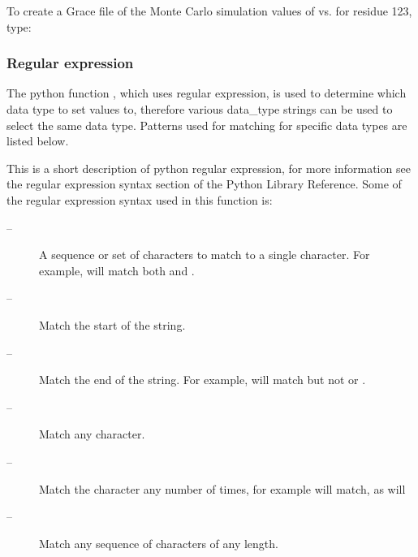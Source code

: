 
 To create a Grace file of the Monte Carlo simulation values of  vs.  for residue 123, type: 
  



  
 \subsubsection{Regular expression} 

 The python function , which uses regular expression, is used to determine which data type to set values to, therefore various data\_type strings can be used to select the same data type.  Patterns used for matching for specific data types are listed below. 
  

 This is a short description of python regular expression, for more information see the regular expression syntax section of the Python Library Reference.  Some of the regular expression syntax used in this function is: 
  

 \begin{description} 
 \item[\quotecmd{[]} --]  A sequence or set of characters to match to a single character.  For example,  will match both  and .  
 \item[\quotecmd{\^{}} --]  Match the start of the string.  
 \item[\quotecmd{\$} --]  Match the end of the string.  For example,  will match  but not  or .  
 \item[ --]  Match any character.  
 \item[ --]  Match the character  any number of times, for example  will match, as will   
 \item[ --]  Match any sequence of characters of any length.  
 \end{description} 
  

